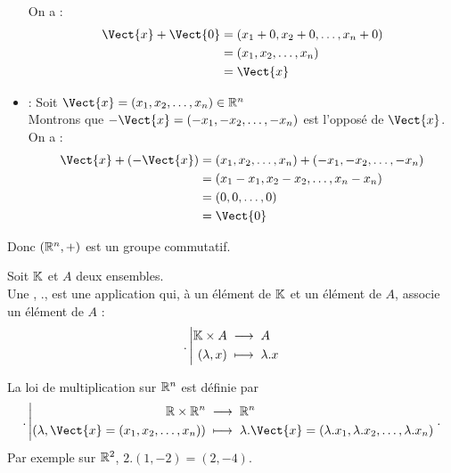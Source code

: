 \documentclass{book}
\begin{document}
\begin{Exemple}[Le Groupe \((\R^n,+)\) ]
\begin{itemize}
 On a :
 $$\begin{aligned}
 \Vect{x}+\Vect{0}&=(x_1+0,x_2+0,\dots,x_n+0)\\
  &=(x_1, x_2, \dots, x_n)\\
  &=\Vect{x}
 \end{aligned}$$
  \item  {} : Soit $\Vect{x}=(x_1,x_2,\dots,x_n)\in\R^n$\\
 Montrons que $-\Vect{x}=(-x_1,-x_2,\dots,-x_n)$ est l'opposé de $\Vect{x}$.\\
 On a :
 $$\begin{aligned}
 \Vect{x}+(-\Vect{x})&=(x_1,x_2,\dots,x_n)+(-x_1,-x_2,\dots,-x_n)\\
  &=(x_1-x_1, x_2-x_2, \dots, x_n-x_n)\\
  &=(0, 0, \dots, 0)\\
  &=\Vect{0}
 \end{aligned}$$
\end{itemize}
Donc $(\R^n,+)$ est un groupe commutatif.
\end{Exemple}


\begin{Definition} Soit $\mathbb{K}$ et $A$ deux ensembles.\\ Une , $.$, est une application qui, à un élément de $\mathbb{K}$ et un élément de $A$, associe un élément de $A$ :
$$ {.}\left|\begin{aligned}{\mathbb{K}\times A}&\;\longrightarrow\;{A}\\{(\lambda,x)}&\;\longmapsto\;{\lambda. x}\end{aligned}\right. $$
\end{Definition}
\begin{Exemple}[\((\R^n,.)\)]
La loi de multiplication sur $\mathbb{R}^n$ est définie par 
$$ \Fonction{.}{\R\times\R^n}{\R^n}{(\lambda,\Vect{x}=(x_1,x_2,\dots,x_n))}{\lambda.\Vect{x}=(\lambda.x_1, \lambda.x_2, \dots, \lambda.x_n)}.$$
Par exemple sur $\mathbb{R}^2$, $2.(1,-2)=(2,-4)$.
\end{Exemple}
\end{document}
